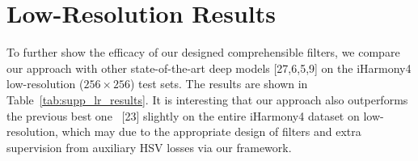 \documentclass[runningheads]{llncs}
\begin{document}
\begin{table*}[!thb]
        \scriptsize
        \begin{center}
        \end{center}
        \caption{\textbf{Efficiency comparison} between DCCF and advanced post-processing methods on different resolutions from 1024 to 3072. 
        'T-C' represents cpu time (ms), 'T-G' represents gpu time (ms) and 'Mem' represents memory usage (MB).
        Note that '-' means no offical implementation is found.
}
        \vspace{-20pt}
        \label{tab:efficiency}
\end{table*}

\section{Low-Resolution Results}
\label{sec:low-res-results}

To further show the efficacy of our designed comprehensible filters, we compare our approach with other state-of-the-art deep models [27,6,5,9] on the iHarmony4 low-resolution ($256\times256$) test sets. 
The results are shown in Table~\ref{tab:supp_lr_results}.
It is interesting that our approach also outperforms the previous best one~ [23] slightly on the entire iHarmony4 dataset on low-resolution, which may due to the appropriate design of filters and extra supervision from auxiliary HSV losses via our framework.
\end{document}
